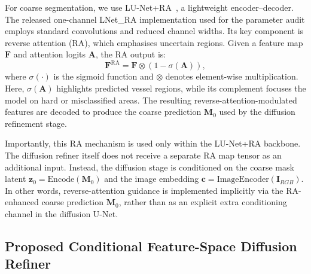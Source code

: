 \documentclass[jimaging,article,submit,pdftex,moreauthors]
  {Definitions/mdpi}
\begin{document}
For coarse segmentation, we use LU-Net+RA~\cite{Hernandez2025}, a lightweight encoder--decoder. The released one-channel LNet\_RA implementation used for the parameter audit employs standard convolutions and reduced channel widths. Its key component is reverse attention (RA), which emphasises uncertain regions. Given a feature map $\mathbf{F}$ and attention logits $\mathbf{A}$, the RA output is:
\begin{equation}
\mathbf{F}^{\text{RA}} = \mathbf{F}\otimes \left(1-\sigma(\mathbf{A})\right),
\end{equation}
where $\sigma(\cdot)$ is the sigmoid function and $\otimes$ denotes element-wise multiplication. Here, $\sigma(\mathbf{A})$ highlights predicted vessel regions, while its complement focuses the model on hard or misclassified areas. The resulting reverse-attention-modulated features are decoded to produce the coarse prediction $\mathbf{M}_0$ used by the diffusion refinement stage.

Importantly, this RA mechanism is used only within the LU-Net+RA backbone. The diffusion refiner itself does not receive a separate RA map tensor as an additional input. Instead, the diffusion stage is conditioned on the coarse mask latent $\mathbf{z}_0=\mathrm{Encode}(\mathbf{M}_0)$ and the image embedding $\mathbf{c}=\mathrm{ImageEncoder}(\mathbf{I}_{RGB})$. In other words, reverse-attention guidance is implemented implicitly via the RA-enhanced coarse prediction $\mathbf{M}_0$, rather than as an explicit extra conditioning channel in the diffusion U-Net.

\subsection{Proposed Conditional Feature-Space Diffusion Refiner}
\end{document}
